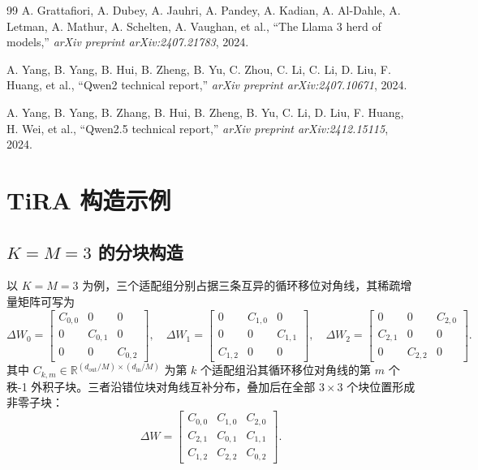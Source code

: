 \documentclass[UTF8,a4paper,11pt]{ctexart}
\newcommand{\R}{\mathbb{R}}
\newcommand{\DeltaW}{\Delta W}
\begin{document}
\begin{thebibliography}{99}
A. Grattafiori, A. Dubey, A. Jauhri, A. Pandey, A. Kadian, A. Al-Dahle, A. Letman, A. Mathur, A. Schelten, A. Vaughan, et al., ``The Llama 3 herd of models,'' \emph{arXiv preprint arXiv:2407.21783}, 2024.

A. Yang, B. Yang, B. Hui, B. Zheng, B. Yu, C. Zhou, C. Li, C. Li, D. Liu, F. Huang, et al., ``Qwen2 technical report,'' \emph{arXiv preprint arXiv:2407.10671}, 2024.

A. Yang, B. Yang, B. Zhang, B. Hui, B. Zheng, B. Yu, C. Li, D. Liu, F. Huang, H. Wei, et al., ``Qwen2.5 technical report,'' \emph{arXiv preprint arXiv:2412.15115}, 2024.

\end{thebibliography}

\appendix

\section{TiRA 构造示例}

\subsection{$K=M=3$ 的分块构造}
\label{app:k3m3}

以 $K=M=3$ 为例，三个适配组分别占据三条互异的循环移位对角线，其稀疏增量矩阵可写为
\begin{equation}
\Delta W_0=
\begin{bmatrix}
C_{0,0} & 0 & 0\\
0 & C_{0,1} & 0\\
0 & 0 & C_{0,2}
\end{bmatrix},\quad
\Delta W_1=
\begin{bmatrix}
0 & C_{1,0} & 0\\
0 & 0 & C_{1,1}\\
C_{1,2} & 0 & 0
\end{bmatrix},\quad
\Delta W_2=
\begin{bmatrix}
0 & 0 & C_{2,0}\\
C_{2,1} & 0 & 0\\
0 & C_{2,2} & 0
\end{bmatrix}.
\end{equation}
其中 $C_{k,m}\in\R^{(d_{\mathrm{out}}/M)\times(d_{\mathrm{in}}/M)}$ 为第 $k$ 个适配组沿其循环移位对角线的第 $m$ 个秩-1 外积子块。三者沿错位块对角线互补分布，叠加后在全部 $3\times3$ 个块位置形成非零子块：
\begin{equation}
\DeltaW=
\begin{bmatrix}
C_{0,0} & C_{1,0} & C_{2,0}\\
C_{2,1} & C_{0,1} & C_{1,1}\\
C_{1,2} & C_{2,2} & C_{0,2}
\end{bmatrix}.
\end{equation}
\end{document}
